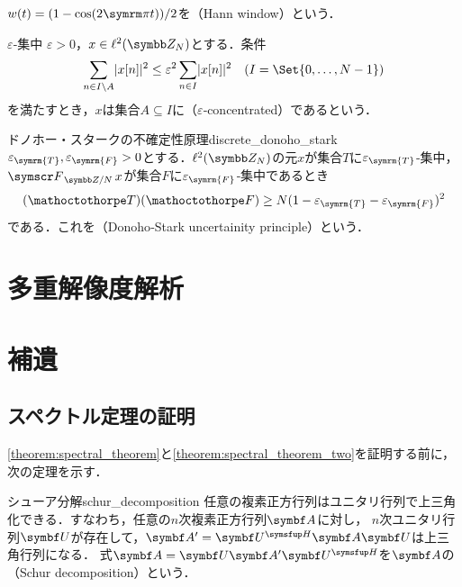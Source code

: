 \documentclass[../../main]{subfiles}
\begin{document}
\begin{example}
  \(w(t)=(1-\cos(2\krez t))/2\)を（Hann window）という．
\end{example}

\begin{definition}{\(\varepsilon\)‐集中}{}
  \(\varepsilon>0\)，\(x\in\cycles{N}\)とする．条件
  \[
    \sum_{n\in I\setminus A}\abs{x[n]}^2 \leq \varepsilon^2\sum_{n\in I}\abs{x[n]}^2\quad(I=\Set{0,\dots,N-1})
  \]
  を満たすとき，\(x\)は集合\(A\subseteq I\)に（\(\varepsilon\)‐concentrated）であるという．
\end{definition}

\begin{theorem}{ドノホー・スタークの不確定性原理}{discrete_donoho_stark}
  \(\varepsilon_{\symrm{T}},\varepsilon_{\symrm{F}}>0\)とする．\(\cycles{N}\)の元\(x\)が集合\(T\)に\(\varepsilon_{\symrm{T}}\)‐集中，\(\dft{N}x\)が集合\(F\)に\(\varepsilon_{\symrm{F}}\)‐集中であるとき
  \[
    (\sizeof{T})(\sizeof{F}) \geq N(1-\varepsilon_{\symrm{T}}-\varepsilon_{\symrm{F}})^2
  \]
  である．これを（Donoho‐Stark uncertainity principle）という．
\end{theorem}

\section{多重解像度解析}
\label{section:discrete_mra}

\section{補遺}

\subsection{スペクトル定理の証明}
\label{subsection:proof_of_the_spectral_theorem}

\cref{theorem:spectral_theorem}と\cref{theorem:spectral_theorem_two}を証明する前に，次の定理を示す．

\begin{theorem}{シューア分解}{schur_decomposition}
  任意の複素正方行列はユニタリ行列で上三角化できる．すなわち，任意の\(n\)次複素正方行列\(\mat{A}\)に対し，
  \(n\)次ユニタリ行列\(\mat{U}\)が存在して，\(\mat{A}'=\htrps{\mat{U}}\mat{A}\mat{U}\)は上三角行列\footnotemark になる．
  式\(\mat{A}=\mat{U}\mat{A}'\htrps{\mat{U}}\)を\(\mat{A}\)の（Schur decomposition）という．
\end{theorem}
\end{document}
